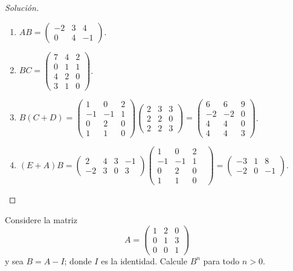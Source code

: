 \documentclass[a4,11pt]{aleph-notas}
\begin{document}
\begin{proof}[Solución]\hspace{0pt}
\begin{enumerate}
    \item $AB = \begin{pmatrix} -2&3&4\\0&4&-1\end{pmatrix}$.
    \item $BC= \begin{pmatrix}7&4&2\\0&1&1\\4&2&0\\3&1&0\end{pmatrix}$.
    \item $B(C+D)=\begin{pmatrix}1&0&2\\-1&-1&1\\0&2&0\\1&1&0\end{pmatrix}\begin{pmatrix} 2&3&3\\2&2&0\\2&2&3 \end{pmatrix}
    =\begin{pmatrix}6&6&9\\-2&-2&0\\4&4&0\\4&4&3\end{pmatrix}$.
    \item $(E+A)B = \begin{pmatrix}2&4&3&-1\\-2&3&0&3\end{pmatrix}
    \begin{pmatrix}1&0&2\\-1&-1&1&\\0&2&0\\1&1&0\end{pmatrix}
    =\begin{pmatrix}-3&1&8\\-2&0&-1\end{pmatrix}$.
\end{enumerate}
\end{proof}

\begin{ejer}
    Considere la matriz
    \[ 
        A=\begin{pmatrix}
            1 & 2 & 0 \\
            0 & 1 & 3 \\
            0 & 0 & 1 
        \end{pmatrix} 
    \]
    y sea $B=A-I$; donde $I$ es la identidad. Calcule $B^{n}$ para todo $n>0$.
\end{ejer}
\end{document}
